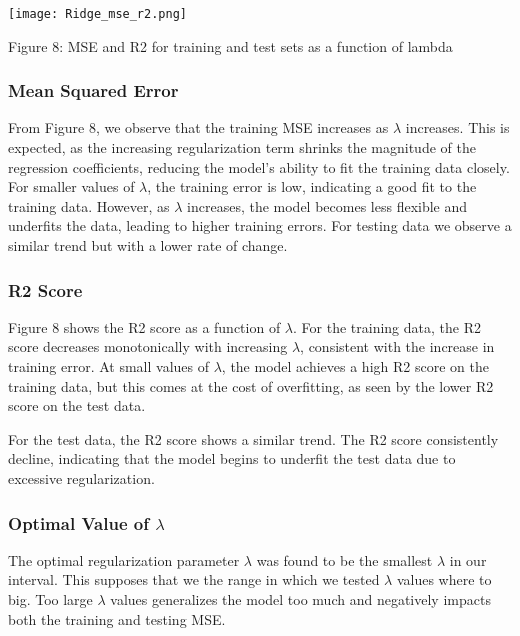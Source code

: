 \documentclass{article}
\begin{document}
\begin{enumerate}
    \texttt{[image: Ridge\_mse\_r2.png]}
    \newline
    \caption{Figure 8: MSE and R2 for training and test sets as a function of lambda}



\subsubsection{Mean Squared Error}

From Figure 8, we observe that the training MSE increases as \( \lambda \) increases. This is expected, as the increasing regularization term shrinks the magnitude of the regression coefficients, reducing the model's ability to fit the training data closely. For smaller values of \( \lambda \), the training error is low, indicating a good fit to the training data. However, as \( \lambda \) increases, the model becomes less flexible and underfits the data, leading to higher training errors. For testing data we observe a similar trend but with a lower rate of change.


\subsubsection{R2 Score}

Figure 8 shows the R2 score as a function of \( \lambda \). For the training data, the R2 score decreases monotonically with increasing \( \lambda \), consistent with the increase in training error. At small values of \( \lambda \), the model achieves a high R2 score on the training data, but this comes at the cost of overfitting, as seen by the lower R2 score on the test data.

For the test data, the R2 score shows a similar trend. The R2 score consistently decline, indicating that the model begins to underfit the test data due to excessive regularization.

\subsubsection{Optimal Value of \( \lambda \)}

The optimal regularization parameter \( \lambda \) was found to be the smallest \( \lambda \) in our interval. This supposes that we the range in which we tested \( \lambda \) values where to big. Too large \( \lambda \) values generalizes the model too much and negatively impacts both the training and testing MSE.



\end{enumerate}
\end{document}
